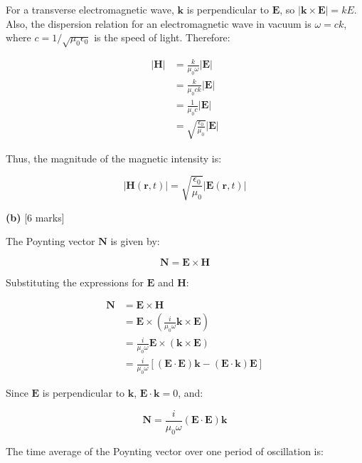 \documentclass{article}
\begin{document}
For a transverse electromagnetic wave, $\mathbf{k}$ is perpendicular to $\mathbf{E}$, so $|\mathbf{k} \times \mathbf{E}| = k E$.  Also, the dispersion relation for an electromagnetic wave in vacuum is $\omega = c k$, where $c = 1/\sqrt{\mu_0 \epsilon_0}$ is the speed of light.  Therefore:

\begin{align*}
|\mathbf{H}| &= \frac{k}{\mu_0 \omega} |\mathbf{E}| \\
&= \frac{k}{\mu_0 c k} |\mathbf{E}| \\
&= \frac{1}{\mu_0 c} |\mathbf{E}| \\
&= \sqrt{\frac{\epsilon_0}{\mu_0}} |\mathbf{E}|
\end{align*}

Thus, the magnitude of the magnetic intensity is:

\begin{equation*}
|\mathbf{H}(\mathbf{r}, t)| = \sqrt{\frac{\epsilon_0}{\mu_0}} |\mathbf{E}(\mathbf{r}, t)|
\end{equation*}

\textbf{(b)} [6 marks]

The Poynting vector $\mathbf{N}$ is given by:

\begin{equation*}
\mathbf{N} = \mathbf{E} \times \mathbf{H}
\end{equation*}

Substituting the expressions for $\mathbf{E}$ and $\mathbf{H}$:

\begin{align*}
\mathbf{N} &= \mathbf{E} \times \mathbf{H} \\
&= \mathbf{E} \times \left( \frac{i}{\mu_0 \omega} \mathbf{k} \times \mathbf{E} \right) \\
&= \frac{i}{\mu_0 \omega} \mathbf{E} \times (\mathbf{k} \times \mathbf{E}) \\
&= \frac{i}{\mu_0 \omega} [(\mathbf{E} \cdot \mathbf{E}) \mathbf{k} - (\mathbf{E} \cdot \mathbf{k}) \mathbf{E}]
\end{align*}

Since $\mathbf{E}$ is perpendicular to $\mathbf{k}$, $\mathbf{E} \cdot \mathbf{k} = 0$, and:

\begin{equation*}
\mathbf{N} = \frac{i}{\mu_0 \omega} (\mathbf{E} \cdot \mathbf{E}) \mathbf{k}
\end{equation*}

The time average of the Poynting vector over one period of oscillation is:
\end{document}
